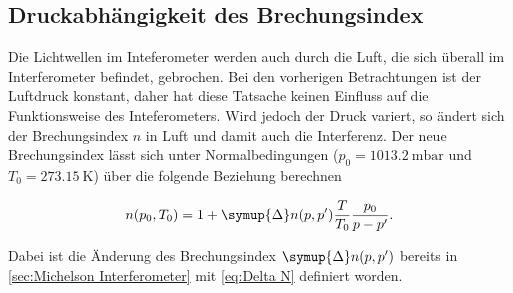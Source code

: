 \subsection{Druckabhängigkeit des Brechungsindex}

Die Lichtwellen im Inteferometer werden auch durch die Luft, die sich überall im Interferometer befindet,
gebrochen. Bei den vorherigen Betrachtungen ist der Luftdruck konstant, daher hat diese Tatsache
keinen Einfluss auf die Funktionsweise des Inteferometers.
Wird jedoch der Druck variert, so ändert sich der Brechungsindex $n$ in Luft und damit auch die Interferenz.
Der neue Brechungsindex lässt sich unter Normalbedingungen ($p_0=\qty{1013.2}{\milli\bar}$ und $T_0=\qty{273.15}{\kelvin}$)
über die folgende Beziehung berechnen

\begin{equation}
    \label{eq:Brechung}
    n(p_0, T_0) = 1 + \symup{\Delta} n(p,p')\frac{T}{T_0}\frac{p_0}{p - p'}.
\end{equation}

Dabei ist die Änderung des Brechungsindex $\symup{\Delta} n(p,p')$ bereits in \autoref{sec:Michelson Interferometer} mit
\eqref{eq:Delta N} definiert worden.